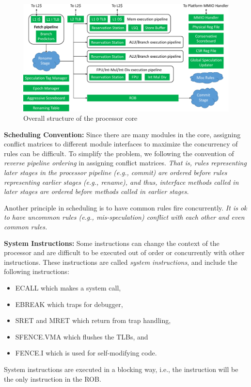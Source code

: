 \documentclass[12pt]{article}
\newcommand{\inst}[1]{\textsf{#1}}
\begin{document}
\begin{figure}
    \centering
    \includegraphics[width=\columnwidth]{fig/core_crop.pdf}
    \caption{Overall structure of the processor core}\label{fig:core}
\end{figure}

\noindent\textbf{Scheduling Convention:}
Since there are many modules in the core, assigning conflict matrices to different module interfaces to maximize the concurrency of rules can be difficult.
To simplify the problem, we following the convention of \emph{reverse pipeline ordering} in assigning conflict matrices.
\emph{That is, rules representing later stages in the processor pipeline (e.g., commit) are ordered before rules representing earlier stages (e.g., rename), and thus, interface methods called in later stages are ordered before methods called in earlier stages.}

Another principle in scheduling is to have common rules fire concurrently.
\emph{It is ok to have uncommon rules (e.g., mis-speculation) conflict with each other and even common rules.}

\noindent\textbf{System Instructions:}
Some instructions can change the context of the processor and are difficult to be executed out of order or concurrently with other instructions.
These instructions are called \emph{system instructions}, and include the following instructions:
\begin{itemize}
    \item \inst{ECALL} which makes a system call,
    \item \inst{EBREAK} which traps for debugger,
    \item \inst{SRET} and \inst{MRET} which return from trap handling,
    \item \inst{SFENCE.VMA} which flushes the TLBs, and
    \item \inst{FENCE.I} which is used for self-modifying code.
\end{itemize}
System instructions are executed in a blocking way, i.e., the instruction will be the only instruction in the ROB.
\end{document}
